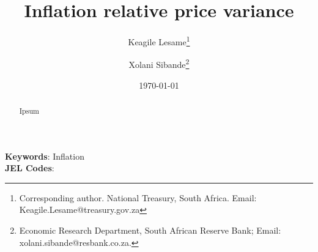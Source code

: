 \title{Inflation relative price variance}
\author {Keagile Lesame\footnote{Corresponding author. National Treasury, South Africa. Email: Keagile.Lesame@treasury.gov.za} \and
Xolani Sibande\footnote{Economic Research Department, South African Reserve Bank; Email: xolani.sibande@resbank.co.za.}}


\date{\today}
\maketitle

\begin{abstract}
Ipsum

\end{abstract}

\noindent\textbf{Keywords}: Inflation\\
\textbf{JEL Codes}: 
\newpage